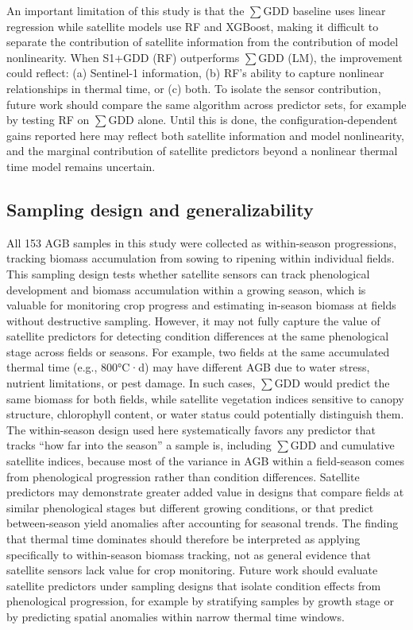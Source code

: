 \documentclass[
  english,
  review,
  number,
  sort,compress,
  authoryear,
  3p]{elsarticle}
\begin{document}
An important limitation of this study is that the \(\sum\)GDD baseline
uses linear regression while satellite models use RF and XGBoost, making
it difficult to separate the contribution of satellite information from
the contribution of model nonlinearity. When S1+GDD (RF) outperforms
\(\sum\)GDD (LM), the improvement could reflect: (a) Sentinel-1
information, (b) RF's ability to capture nonlinear relationships in
thermal time, or (c) both. To isolate the sensor contribution, future
work should compare the same algorithm across predictor sets, for
example by testing RF on \(\sum\)GDD alone. Until this is done, the
configuration-dependent gains reported here may reflect both satellite
information and model nonlinearity, and the marginal contribution of
satellite predictors beyond a nonlinear thermal time model remains
uncertain.

\subsection{Sampling design and
generalizability}\label{sampling-design-and-generalizability}

All 153 AGB samples in this study were collected as within-season
progressions, tracking biomass accumulation from sowing to ripening
within individual fields. This sampling design tests whether satellite
sensors can track phenological development and biomass accumulation
within a growing season, which is valuable for monitoring crop progress
and estimating in-season biomass at fields without destructive sampling.
However, it may not fully capture the value of satellite predictors for
detecting condition differences at the same phenological stage across
fields or seasons. For example, two fields at the same accumulated
thermal time (e.g., 800°C·d) may have different AGB due to water stress,
nutrient limitations, or pest damage. In such cases, \(\sum\)GDD would
predict the same biomass for both fields, while satellite vegetation
indices sensitive to canopy structure, chlorophyll content, or water
status could potentially distinguish them. The within-season design used
here systematically favors any predictor that tracks ``how far into the
season'' a sample is, including \(\sum\)GDD and cumulative satellite
indices, because most of the variance in AGB within a field-season comes
from phenological progression rather than condition differences.
Satellite predictors may demonstrate greater added value in designs that
compare fields at similar phenological stages but different growing
conditions, or that predict between-season yield anomalies after
accounting for seasonal trends. The finding that thermal time dominates
should therefore be interpreted as applying specifically to
within-season biomass tracking, not as general evidence that satellite
sensors lack value for crop monitoring. Future work should evaluate
satellite predictors under sampling designs that isolate condition
effects from phenological progression, for example by stratifying
samples by growth stage or by predicting spatial anomalies within narrow
thermal time windows.
\end{document}
